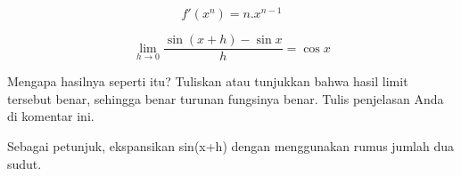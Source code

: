 \documentclass[12pt,Times new roman,letterpaper]{book}
\begin{document}
\begin{eulernootebook}
\begin{eulercomment}
\begin{eulercomment}
\begin{eulernootebook}
\begin{eulercomment}
\begin{eulercomment}
\begin{eulercomment}
\begin{eulercomment}
\begin{eulercomment}
\begin{eulercomment}
\begin{eulernotebook}
\begin{eulercomment}
\begin{eulercomment}
\begin{eulercomment}
\begin{eulercomment}
\begin{eulercomment}
\begin{eulercomment}
\begin{eulerformula}
\[
f'(x^n) = n.x^{n-1}
\]
\end{eulerformula}
\eulersubheading{}
\begin{eulerformula}
\[
\lim_{h\rightarrow 0}{\frac{\sin \left(x+h\right)-\sin x}{h}}=\cos 
 x
\]
\end{eulerformula}
\begin{eulercomment}
Mengapa hasilnya seperti itu? Tuliskan atau tunjukkan bahwa hasil
limit tersebut benar, sehingga benar turunan fungsinya benar. Tulis
penjelasan Anda di komentar ini. 

Sebagai petunjuk, ekspansikan sin(x+h) dengan menggunakan rumus jumlah
dua sudut.


\end{eulercomment}
\end{eulercomment}
\end{eulercomment}
\end{eulercomment}
\end{eulercomment}
\end{eulercomment}
\end{eulercomment}
\end{eulernotebook}
\end{eulercomment}
\end{eulercomment}
\end{eulercomment}
\end{eulercomment}
\end{eulercomment}
\end{eulercomment}
\end{eulernootebook}
\end{eulercomment}
\end{eulercomment}
\end{eulernootebook}
\end{document}
